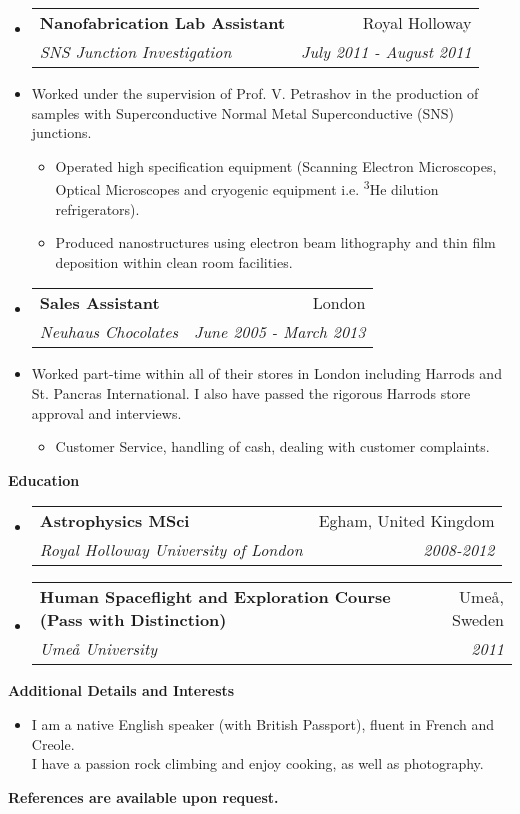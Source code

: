 \documentclass[letterpaper,11pt]{article}
\makeatletter
\newcommand{\resitem}[1]{\item #1 \vspace{-2pt}}
\newcommand{\resheading}[1]{{\large \colorbox{mygrey}
                            {\begin{minipage}{\textwidth}
                            {\textbf{#1 \vphantom{p\^{E}}}}
                            \end{minipage}}}
}
\newcommand{\ressubheading}[4]{
                \begin{tabular*}{180mm}{l@{\extracolsep{\fill}}r}
                \textbf{#1} & #2 \\
                \textit{#3} & \textit{#4} \\
                \end{tabular*}\vspace{-6pt}
}
\newcommand{\resdescription}[1]{#1 \vspace{-0mm}}
\makeatother
\begin{document}
\begin{itemize}
        \item[]
            \ressubheading{Nanofabrication Lab Assistant}{Royal Holloway}{SNS Junction Investigation}{July 2011 - August 2011}
        \item[]
            \resdescription{Worked under the supervision of Prof. V. Petrashov in the production of samples with Superconductive Normal Metal Superconductive (SNS) junctions.}
            \begin{itemize}
                    \resitem{Operated high specification equipment (Scanning Electron Microscopes, Optical Microscopes and cryogenic equipment i.e. \textsuperscript{3}He dilution refrigerators).}
                    \resitem{Produced nanostructures using electron beam lithography and thin film deposition within clean room facilities.}
            \end{itemize}

        \item[]
            \ressubheading{Sales Assistant}{London}{Neuhaus Chocolates}{June 2005 - March 2013}
        \item[]
            \resdescription{Worked part-time within all of their stores in London including Harrods and St. Pancras International. I also have passed the rigorous Harrods store approval and interviews.}
            \begin{itemize}
                    \resitem{Customer Service, handling of cash, dealing with customer complaints.}
            \end{itemize}

    \end{itemize}

    \resheading{Education}
    \begin{itemize}
        \item[]
            \ressubheading{Astrophysics MSci }{Egham, United Kingdom}{Royal Holloway University of London}{2008-2012}

        \item[]
            \ressubheading{Human Spaceflight and Exploration Course (Pass with Distinction)}{Ume\r{a}, Sweden}{Ume\r{a} University}{2011}

    \end{itemize}

    \resheading{Additional Details and Interests}
    \begin{itemize}
        \item[] I am a native English speaker (with British Passport), fluent in French and Creole.\\
            I have a passion rock climbing and enjoy cooking, as well as photography. \\
    \end{itemize}

    \textbf{References are available upon request.}

    
\end{document}
